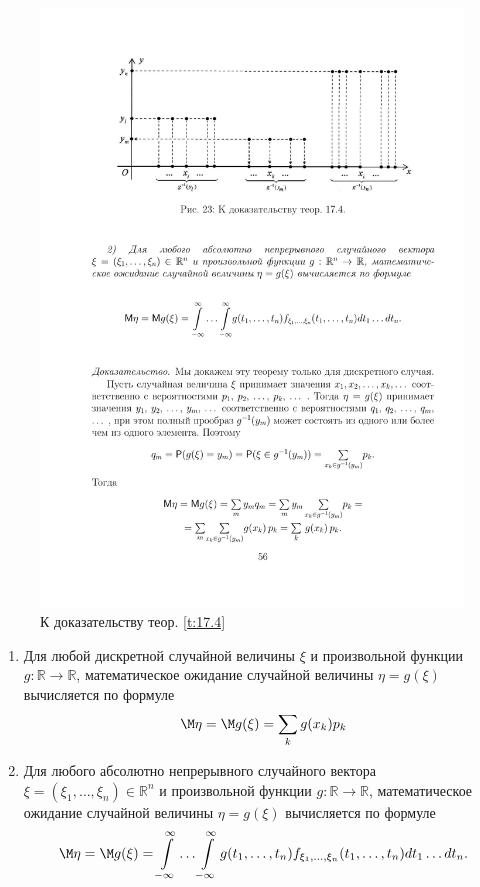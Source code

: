 \begin{figure}[H]
	\centering
	\includegraphics[]{pic/pic23}
	\caption{К доказательству теор. \ref{t:17.4}}
	\label{fig23}
\end{figure}
\begin{theorem}
\label{t:17.4}
\begin{enumerate}
	\item Для любой дискретной случайной величины $\xi$ и произвольной функции $g : \mathbb{R} \to \mathbb{R}$, математическое ожидание случайной величины $\eta = g(\xi)$ вычисляется по формуле
		\begin{equation*}
			\M\eta=\M g(\xi)=\sum_k g(x_k)p_k
		\end{equation*}
	\item Для любого абсолютно непрерывного случайного вектора
	$\xi = (\xi_1, \dots, \xi_n) \in \mathbb{R}^n$ и произвольной функции 
	$g : \mathbb{R} \to \mathbb{R}$, математическое ожидание случайной величины 
	$\eta = g(\xi)$ вычисляется по формуле
		\begin{equation*}
			\M\eta=\M g(\xi)=\int\limits_{-\infty}^{\infty}\ldots
			\int\limits_{-\infty}^{\infty}g(t_1,\ldots,t_n)f_{\xi_1,\ldots,\xi_n}(t_1,\ldots,t_n)dt_1\dots dt_n.
		\end{equation*}
\end{enumerate}


\label{t:17.4}
\end{theorem}

